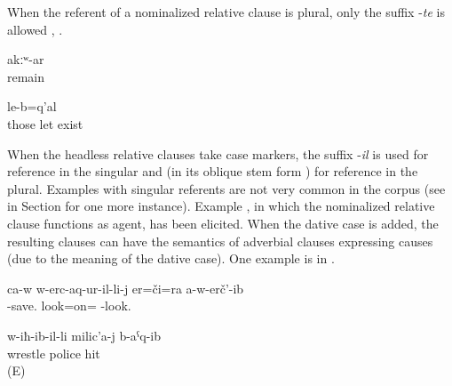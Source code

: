 When the referent of a nominalized relative clause is plural, only the suffix -\textit{te} is allowed , . 
%
\begin{exe}
	\ex	\label{ex:Except from those who were there somewhere (i.e. hid themselves), there are no remaining ones}
	\gll	[kelg-un-te]	akːʷ-ar\\
		remain \\
	\glt	{}

	\ex	\label{ex:There are those that they put there (lit. from above let down their own people)}
		le-b=q'al\\
		those		let exist\\
	\glt	{}
\end{exe}

When the headless relative clauses take case markers, the suffix -\textit{il} is used for reference in the singular and  (in its oblique stem form ) for reference in the plural. Examples with singular referents are not very common in the corpus  (see  in Section  for one more instance). Example , in which the nominalized relative clause functions as agent, has been elicited. When the dative case is added, the resulting clauses can have the semantics of adverbial clauses expressing causes (due to the meaning of the dative case). One example is  in . 
%
\begin{exe}
	\ex	\label{ex:He did not even look at his savior.}
	\gll	ca-w	w-erc-aq-ur-il-li-j	er=či=ra	a-w-erč'-ib	\\
			-save.	look=on=	-look.	\\
	\glt	{}

	\ex	\label{ex:‎The one who was wrestling hit the police officer}
	\gll	w-iħ-ib-il-li	milic'a-j	b-aˁq-ib\\
		wrestle	police	hit\\
	\glt	{} (E)
\end{exe}


